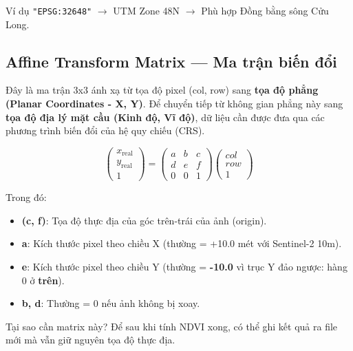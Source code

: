 \documentclass[12pt,a4paper]{report}
\begin{document}
\begin{insightbox}{Ví dụ}
\texttt{"EPSG:32648"} $\rightarrow$ UTM Zone 48N $\rightarrow$ Phù hợp Đồng bằng sông Cửu Long.
\end{insightbox}

\subsection{Affine Transform Matrix — Ma trận biến đổi}
Đây là ma trận 3x3 ánh xạ từ tọa độ pixel (col, row) sang \textbf{tọa độ phẳng (Planar Coordinates - X, Y)}. Để chuyển tiếp từ không gian phẳng này sang \textbf{tọa độ địa lý mặt cầu (Kinh độ, Vĩ độ)}, dữ liệu cần được đưa qua các phương trình biến đổi của hệ quy chiếu (CRS).

\begin{equation*}
    \begin{pmatrix}
    x_{\text{real}}\\
    y_{\text{real}}\\
    1
    \end{pmatrix}
    =
    \begin{pmatrix}
    a  &  b  &  c \\
    d  &  e  &  f \\
    0  &  0  &  1
    \end{pmatrix}
    \begin{pmatrix}
    col \\
    row \\
    1
    \end{pmatrix}
\end{equation*}

Trong đó:
\begin{itemize}
    \item \textbf{(c, f)}: Tọa độ thực địa của góc trên-trái của ảnh (origin).
    \item \textbf{a}: Kích thước pixel theo chiều X (thường = +10.0 mét với Sentinel-2 10m).
    \item \textbf{e}: Kích thước pixel theo chiều Y (thường = \textbf{-10.0} vì trục Y đảo ngược: hàng 0 ở \textbf{trên}).
    \item \textbf{b, d}: Thường = 0 nếu ảnh không bị xoay.
\end{itemize}

\begin{insightbox}{Tại sao cần matrix này?}
Để sau khi tính NDVI xong, có thể ghi kết quả ra file mới mà vẫn giữ nguyên tọa độ thực địa.
\end{insightbox}
\end{document}
